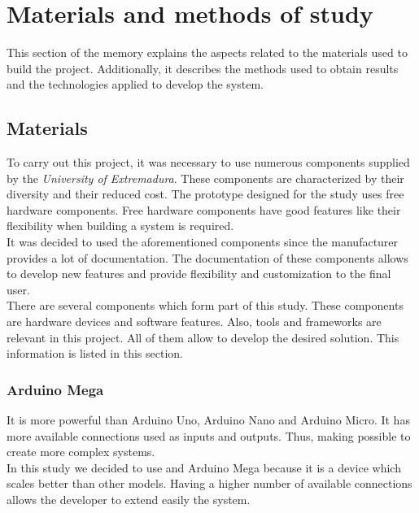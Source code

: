 
\chapter{Materials and methods of study}
\newpage

This section of the memory explains the aspects related to the materials used to build the project. Additionally, it describes the methods used to obtain results and the technologies applied to develop the system.

\section{Materials}

To carry out this project, it was necessary to use numerous components supplied by the \textit{University of Extremadura}. These components are characterized by their diversity and their reduced cost. The prototype designed for the study uses free hardware components. Free hardware components have good features like their flexibility when building a system is required.\\

It was decided to used the aforementioned components since the manufacturer provides a lot of documentation. The documentation of these components allows to develop new features and provide flexibility and customization to the final user.\\

There are several components which form part of this study. These components are hardware devices and software features. Also, tools and frameworks are relevant in this project. All of them allow to develop the desired solution. This information is listed in this section.

\subsection{Arduino Mega}

It is more powerful than Arduino Uno, Arduino Nano and Arduino Micro. It has more available connections used as inputs and outputs. Thus, making possible to create more complex systems.\\

In this study we decided to use and Arduino Mega because it is a device which scales better than other models. Having a higher number of available connections allows the developer to extend easily the system.\\

